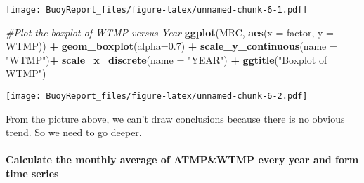 \documentclass[]{article}
\newenvironment{Shaded}{\begin{snugshade}}{\end{snugshade}}
\newcommand{\CommentTok}[1]{\textcolor[rgb]{0.56,0.35,0.01}{\textit{#1}}}
\newcommand{\DataTypeTok}[1]{\textcolor[rgb]{0.13,0.29,0.53}{#1}}
\newcommand{\FloatTok}[1]{\textcolor[rgb]{0.00,0.00,0.81}{#1}}
\newcommand{\KeywordTok}[1]{\textcolor[rgb]{0.13,0.29,0.53}{\textbf{#1}}}
\newcommand{\NormalTok}[1]{#1}
\newcommand{\OperatorTok}[1]{\textcolor[rgb]{0.81,0.36,0.00}{\textbf{#1}}}
\newcommand{\StringTok}[1]{\textcolor[rgb]{0.31,0.60,0.02}{#1}}
\let\oldparagraph\paragraph
\renewcommand{\paragraph}[1]{\oldparagraph{#1}\mbox{}}
\begin{document}
\texttt{[image: BuoyReport\_files/figure-latex/unnamed-chunk-6-1.pdf]}

\begin{Shaded}
\begin{Highlighting}[]
\CommentTok{#Plot the boxplot of WTMP versus Year}
\KeywordTok{ggplot}\NormalTok{(MRC, }\KeywordTok{aes}\NormalTok{(}\DataTypeTok{x =}\NormalTok{ factor, }\DataTypeTok{y =}\NormalTok{ WTMP)) }\OperatorTok{+}
\StringTok{  }\KeywordTok{geom_boxplot}\NormalTok{(}\DataTypeTok{alpha=}\FloatTok{0.7}\NormalTok{) }\OperatorTok{+}
\StringTok{  }\KeywordTok{scale_y_continuous}\NormalTok{(}\DataTypeTok{name =} \StringTok{"WTMP"}\NormalTok{)}\OperatorTok{+}
\StringTok{  }\KeywordTok{scale_x_discrete}\NormalTok{(}\DataTypeTok{name =} \StringTok{"YEAR"}\NormalTok{) }\OperatorTok{+}
\StringTok{  }\KeywordTok{ggtitle}\NormalTok{(}\StringTok{"Boxplot of WTMP"}\NormalTok{)}
\end{Highlighting}
\end{Shaded}

\texttt{[image: BuoyReport\_files/figure-latex/unnamed-chunk-6-2.pdf]}

From the picture above, we can't draw conclusions because there is no
obvious trend. So we need to go deeper.

\hypertarget{calculate-the-monthly-average-of-atmpwtmp-every-year-and-form-time-series}{%
\paragraph{Calculate the monthly average of ATMP\&WTMP every year and
form time
series}\label{calculate-the-monthly-average-of-atmpwtmp-every-year-and-form-time-series}}
\end{document}
